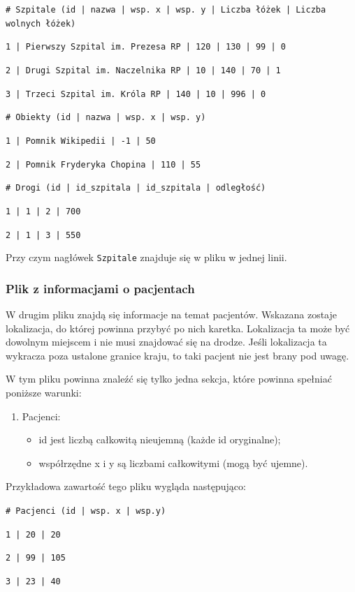 \documentclass[12pt,a4paper]{article}
\begin{document}
\begin{flushleft}
\texttt{\# Szpitale (id | nazwa | wsp. x | wsp. y | Liczba łóżek | Liczba wolnych łóżek)}

\texttt{1 | Pierwszy Szpital im. Prezesa RP | 120 | 130 | 99 | 0}

\texttt{2 | Drugi Szpital im. Naczelnika RP | 10 | 140 | 70 | 1}

\texttt{3 | Trzeci Szpital im. Króla RP | 140 | 10 | 996 | 0}

\texttt{\# Obiekty (id | nazwa | wsp. x | wsp. y)}

\texttt{1 | Pomnik Wikipedii | -1 | 50}

\texttt{2 | Pomnik Fryderyka Chopina | 110 | 55}

\texttt{\# Drogi (id | id\_szpitala | id\_szpitala | odległość)}

\texttt{1 | 1 | 2 | 700}

\texttt{2 | 1 | 3 | 550}

\end{flushleft}
Przy czym nagłówek \texttt{Szpitale} znajduje się w pliku w jednej linii.

\subsubsection{Plik z informacjami o pacjentach}
W drugim pliku znajdą się informacje na temat pacjentów. Wskazana zostaje lokalizacja, do której powinna przybyć po nich karetka. Lokalizacja ta może być dowolnym miejscem i nie musi znajdować się na drodze. Jeśli lokalizacja ta wykracza poza ustalone granice kraju, to taki pacjent nie jest brany pod uwagę.

W tym pliku powinna znaleźć się tylko jedna sekcja, które powinna spełniać poniższe warunki:
\begin{enumerate}
\item Pacjenci:

\begin{itemize}
\item id jest liczbą całkowitą nieujemną (każde id oryginalne); 
\item współrzędne x i y są liczbami całkowitymi (mogą być ujemne).
\end{itemize}

\end{enumerate}
Przykładowa zawartość tego pliku wygląda następująco:

\begin{flushleft}
\texttt{\# Pacjenci (id | wsp. x | wsp.y)}

\texttt{1 | 20 | 20}

\texttt{2 | 99 | 105}

\texttt{3 | 23 | 40}
\end{flushleft}
\end{document}
